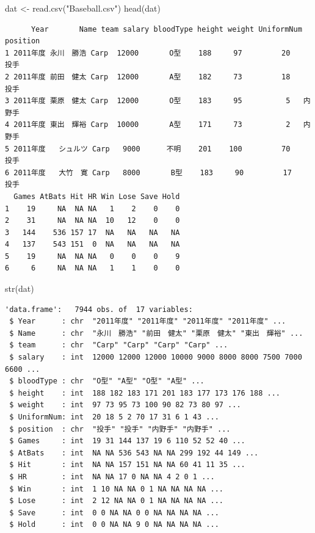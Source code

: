 \documentclass[
  a4paper,
]{book}
\newenvironment{Shaded}{\begin{snugshade}}{\end{snugshade}}
\newcommand{\FunctionTok}[1]{\textcolor[rgb]{0.28,0.35,0.67}{#1}}
\newcommand{\NormalTok}[1]{\textcolor[rgb]{0.00,0.23,0.31}{#1}}
\newcommand{\OtherTok}[1]{\textcolor[rgb]{0.00,0.23,0.31}{#1}}
\newcommand{\StringTok}[1]{\textcolor[rgb]{0.13,0.47,0.30}{#1}}
\begin{document}
\begin{Shaded}
\begin{Highlighting}[]
\NormalTok{dat }\OtherTok{\textless{}{-}} \FunctionTok{read.csv}\NormalTok{(}\StringTok{"Baseball.csv"}\NormalTok{)}
\FunctionTok{head}\NormalTok{(dat)}
\end{Highlighting}
\end{Shaded}

\begin{verbatim}
      Year       Name team salary bloodType height weight UniformNum position
1 2011年度 永川　勝浩 Carp  12000       O型    188     97         20     投手
2 2011年度 前田　健太 Carp  12000       A型    182     73         18     投手
3 2011年度 栗原　健太 Carp  12000       O型    183     95          5   内野手
4 2011年度 東出　輝裕 Carp  10000       A型    171     73          2   内野手
5 2011年度   シュルツ Carp   9000      不明    201    100         70     投手
6 2011年度   大竹　寛 Carp   8000       B型    183     90         17     投手
  Games AtBats Hit HR Win Lose Save Hold
1    19     NA  NA NA   1    2    0    0
2    31     NA  NA NA  10   12    0    0
3   144    536 157 17  NA   NA   NA   NA
4   137    543 151  0  NA   NA   NA   NA
5    19     NA  NA NA   0    0    0    9
6     6     NA  NA NA   1    1    0    0
\end{verbatim}

\begin{Shaded}
\begin{Highlighting}[]
\FunctionTok{str}\NormalTok{(dat)}
\end{Highlighting}
\end{Shaded}

\begin{verbatim}
'data.frame':   7944 obs. of  17 variables:
 $ Year      : chr  "2011年度" "2011年度" "2011年度" "2011年度" ...
 $ Name      : chr  "永川　勝浩" "前田　健太" "栗原　健太" "東出　輝裕" ...
 $ team      : chr  "Carp" "Carp" "Carp" "Carp" ...
 $ salary    : int  12000 12000 12000 10000 9000 8000 8000 7500 7000 6600 ...
 $ bloodType : chr  "O型" "A型" "O型" "A型" ...
 $ height    : int  188 182 183 171 201 183 177 173 176 188 ...
 $ weight    : int  97 73 95 73 100 90 82 73 80 97 ...
 $ UniformNum: int  20 18 5 2 70 17 31 6 1 43 ...
 $ position  : chr  "投手" "投手" "内野手" "内野手" ...
 $ Games     : int  19 31 144 137 19 6 110 52 52 40 ...
 $ AtBats    : int  NA NA 536 543 NA NA 299 192 44 149 ...
 $ Hit       : int  NA NA 157 151 NA NA 60 41 11 35 ...
 $ HR        : int  NA NA 17 0 NA NA 4 2 0 1 ...
 $ Win       : int  1 10 NA NA 0 1 NA NA NA NA ...
 $ Lose      : int  2 12 NA NA 0 1 NA NA NA NA ...
 $ Save      : int  0 0 NA NA 0 0 NA NA NA NA ...
 $ Hold      : int  0 0 NA NA 9 0 NA NA NA NA ...
\end{verbatim}
\end{document}
